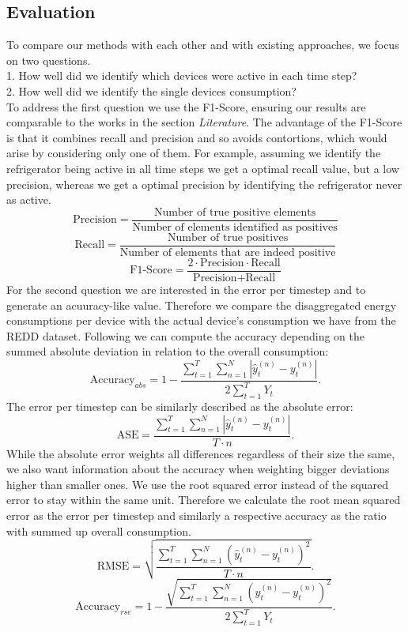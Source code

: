 \documentclass{article}
\begin{document}
\subsection{Evaluation}
To compare our methods with each other and with existing approaches, we focus on two questions.\\
1. How well did we identify which devices were active in each time step?\\
2. How well did we identify the single devices consumption?\\
To address the first question we use the F1-Score, ensuring our results are comparable to the works in the section \textit{Literature}. The 
advantage of the F1-Score is that it combines recall and precision and so avoids contortions, which would arise by considering only one of them. For example, assuming we 
identify the refrigerator being active in all time steps we get a optimal recall value, but a low precision, whereas we get a optimal precision by identifying the refrigerator never as active.
\[ \textrm{Precision} = \frac{\textrm{Number of true positive elements}}{\textrm{Number of elements identified as positives}}  \]
\[ \textrm{Recall} = \frac{\textrm{Number of true positives}}{\textrm{Number of elements that are indeed positive}}  \]
\[ \textrm{F1-Score} = \frac{2 \cdot \textrm{Precision} \cdot \textrm{Recall}}{\textrm{Precision} + \textrm{Recall}}\]
For the second question we are interested in the error per timestep and to generate an acuuracy-like value. Therefore we
compare the disaggregated energy consumptions per device with the actual device's consumption we have from the REDD
dataset. Following \cite{Redd} we can compute the accuracy depending on the summed absolute deviation in relation to 
the overall consumption:
\[\textrm{Accuracy}_{abs} = 1- \frac{\sum^{T}_{t=1}\sum^{N}_{n=1}|\hat{y}^{(n)}_t-y^{(n)}_t|}{2 \sum^{T}_{t=1}Y_t} .  \]
The error per timestep can be similarly described as the absolute error:
\[\textrm{ASE} = \frac{\sum^{T}_{t=1}\sum^{N}_{n=1}|\hat{y}^{(n)}_t-y^{(n)}_t|}{T \cdot n} .  \]
While the absolute error weights all differences regardless of their size the same, we also want information about the accuracy when 
weighting bigger deviations higher than smaller ones. We use the root squared error instead of the squared error 
to stay within the same unit. Therefore we calculate the root mean squared error as the error per timestep and similarly a respective 
accuracy as the ratio with summed up overall consumption.
\[\textrm{RMSE} = \sqrt{\frac{\sum^{T}_{t=1}\sum^{N}_{n=1}(\hat{y}^{(n)}_t-y^{(n)}_t)^2}{T \cdot n}} .  \]
\[\textrm{Accuracy}_{rse} = 1- \frac{\sqrt{\sum^{T}_{t=1}\sum^{N}_{n=1}(\hat{y}^{(n)}_t-y^{(n)}_t)^2}}{2 \sum^{T}_{t=1}Y_t} .  \]
\end{document}
